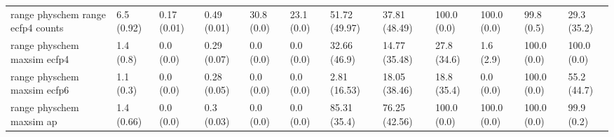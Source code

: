 \begin{tabular}{llllllllllll}
range physchem range ecfp4 counts & {\cellcolor[HTML]{EEF8FB}} \color[HTML]{000000} 6.5 (0.92) & {\cellcolor[HTML]{F7FCFD}} \color[HTML]{000000} 0.17 (0.01) & {\cellcolor[HTML]{67C2A5}} \color[HTML]{000000} 0.49 (0.01) & {\cellcolor[HTML]{F7FCFD}} \color[HTML]{000000} 30.8 (0.0) & {\cellcolor[HTML]{F7FCFD}} \color[HTML]{000000} 23.1 (0.0) & {\cellcolor[HTML]{61BF9E}} \color[HTML]{000000} 51.72 (49.97) & {\cellcolor[HTML]{98D8C9}} \color[HTML]{000000} 37.81 (48.49) & {\cellcolor[HTML]{00441B}} \color[HTML]{F1F1F1} 100.0 (0.0) & {\cellcolor[HTML]{00441B}} \color[HTML]{F1F1F1} 100.0 (0.0) & {\cellcolor[HTML]{00441B}} \color[HTML]{F1F1F1} 99.8 (0.5) & {\cellcolor[HTML]{00441B}} \color[HTML]{F1F1F1} 29.3 (35.2) \\
range physchem maxsim ecfp4 & {\cellcolor[HTML]{F5FBFD}} \color[HTML]{000000} 1.4 (0.8) & {\cellcolor[HTML]{F7FCFD}} \color[HTML]{000000} 0.0 (0.0) & {\cellcolor[HTML]{7FCDB6}} \color[HTML]{000000} 0.29 (0.07) & {\cellcolor[HTML]{F7FCFD}} \color[HTML]{000000} 0.0 (0.0) & {\cellcolor[HTML]{F7FCFD}} \color[HTML]{000000} 0.0 (0.0) & {\cellcolor[HTML]{ADE0D4}} \color[HTML]{000000} 32.66 (46.9) & {\cellcolor[HTML]{E1F4F6}} \color[HTML]{000000} 14.77 (35.48) & {\cellcolor[HTML]{00441B}} \color[HTML]{F1F1F1} 27.8 (34.6) & {\cellcolor[HTML]{00441B}} \color[HTML]{F1F1F1} 1.6 (2.9) & {\cellcolor[HTML]{00451C}} \color[HTML]{F1F1F1} 100.0 (0.0) & {\cellcolor[HTML]{E1F4F6}} \color[HTML]{000000} 100.0 (0.0) \\
range physchem maxsim ecfp6 & {\cellcolor[HTML]{F6FCFD}} \color[HTML]{000000} 1.1 (0.3) & {\cellcolor[HTML]{F7FCFD}} \color[HTML]{000000} 0.0 (0.0) & {\cellcolor[HTML]{87D0BC}} \color[HTML]{000000} 0.28 (0.05) & {\cellcolor[HTML]{F7FCFD}} \color[HTML]{000000} 0.0 (0.0) & {\cellcolor[HTML]{F7FCFD}} \color[HTML]{000000} 0.0 (0.0) & {\cellcolor[HTML]{F3FAFC}} \color[HTML]{000000} 2.81 (16.53) & {\cellcolor[HTML]{DAF1F1}} \color[HTML]{000000} 18.05 (38.46) & {\cellcolor[HTML]{00441B}} \color[HTML]{F1F1F1} 18.8 (35.4) & {\cellcolor[HTML]{00441B}} \color[HTML]{F1F1F1} 0.0 (0.0) & {\cellcolor[HTML]{00441B}} \color[HTML]{F1F1F1} 100.0 (0.0) & {\cellcolor[HTML]{E3F4F7}} \color[HTML]{000000} 55.2 (44.7) \\
range physchem maxsim ap & {\cellcolor[HTML]{F5FBFD}} \color[HTML]{000000} 1.4 (0.66) & {\cellcolor[HTML]{F7FCFD}} \color[HTML]{000000} 0.0 (0.0) & {\cellcolor[HTML]{78CAB1}} \color[HTML]{000000} 0.3 (0.03) & {\cellcolor[HTML]{F7FCFD}} \color[HTML]{000000} 0.0 (0.0) & {\cellcolor[HTML]{F7FCFD}} \color[HTML]{000000} 0.0 (0.0) & {\cellcolor[HTML]{067230}} \color[HTML]{F1F1F1} 85.31 (35.4) & {\cellcolor[HTML]{1F8742}} \color[HTML]{F1F1F1} 76.25 (42.56) & {\cellcolor[HTML]{00441B}} \color[HTML]{F1F1F1} 100.0 (0.0) & {\cellcolor[HTML]{00441B}} \color[HTML]{F1F1F1} 100.0 (0.0) & {\cellcolor[HTML]{00441B}} \color[HTML]{F1F1F1} 100.0 (0.0) & {\cellcolor[HTML]{DDF2F3}} \color[HTML]{000000} 99.9 (0.2) \\

\end{tabular}
